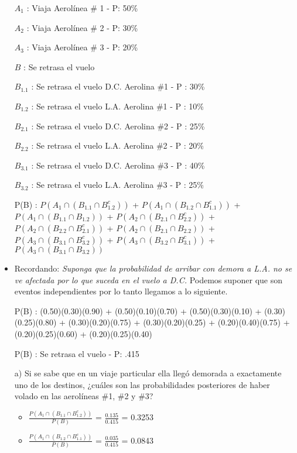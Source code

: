 \documentclass[12pt, letterpaper, spanish]{article}
\begin{document}
\begin{itemize}
    \item [$A_1$] : Viaja Aerol\'inea \# 1 - P: 50\%
    \item [$A_2$] : Viaja Aerol\'inea \# 2 - P: 30\%
    \item [$A_3$] : Viaja Aerol\'inea \# 3 - P: 20\%
    \item [$B$] : Se retrasa el vuelo
    \item [$B_{1.1}$] : Se retrasa el vuelo D.C. Aerolina \#1 - P : 30\%
    \item [$B_{1.2}$] : Se retrasa el vuelo L.A. Aerolina \#1 - P : 10\%
    \item [$B_{2.1}$] : Se retrasa el vuelo D.C. Aerolina \#2 - P : 25\%
    \item [$B_{2.2}$] : Se retrasa el vuelo L.A. Aerolina \#2 - P : 20\%
    \item [$B_{3.1}$] : Se retrasa el vuelo D.C. Aerolina \#3 - P : 40\%
    \item [$B_{3.2}$] : Se retrasa el vuelo L.A. Aerolina \#3 - P : 25\%
    \item [P(B)] : $P(A_1 \cap (B_{1.1} \cap B_{1.2}^{c}))$ + $P(A_1 \cap (B_{1.2} \cap B_{1.1}^{c}))$ + $P(A_1 \cap (B_{1.1} \cap B_{1.2}))$ + $P(A_2 \cap (B_{2.1} \cap B_{2.2}^{c}))$ + $P(A_2 \cap (B_{2.2} \cap B_{2.1}^{c}))$ + $P(A_2 \cap (B_{2.1} \cap B_{2.2}))$ + $P(A_3 \cap (B_{3.1} \cap B_{3.2}^{c}))$ + $P(A_3 \cap (B_{3.2} \cap B_{3.1}^{c}))$ + $P(A_3 \cap (B_{3.1} \cap B_{3.2}))$
    \item Recordando: \textit{Suponga que la probabilidad de arribar con demora a L.A. no se ve afectada por lo que suceda en el vuelo a D.C.} Podemos suponer que son eventos independientes por lo tanto llegamos a lo siguiente.
    \item [P(B)] : (0.50)(0.30)(0.90) + (0.50)(0.10)(0.70) + (0.50)(0.30)(0.10) + (0.30)(0.25)(0.80) + (0.30)(0.20)(0.75) + (0.30)(0.20)(0.25) + (0.20)(0.40)(0.75) + (0.20)(0.25)(0.60) + (0.20)(0.25)(0.40)
    \item [P(B)] : Se retrasa el vuelo - P: .415
    \item [a)]  Si se sabe que en un viaje particular ella llegó demorada a exactamente uno de los destinos, ¿cuáles son las probabilidades posteriores de haber volado en las aerolíneas \#1, \#2 y \#3?
    \begin{itemize}
        \item $\displaystyle\frac{P(A_1 \cap (B_{1.1} \cap B_{1.2}^{c}))}{P(B)}$ = $\displaystyle\frac{0.135}{0.415}$ = 0.3253
        \item $\displaystyle\frac{P(A_1 \cap (B_{1.2} \cap B_{1.1}^{c}))}{P(B)}$ = $\displaystyle\frac{0.035}{0.415}$ = 0.0843

\end{itemize}
\end{itemize}
\end{document}
